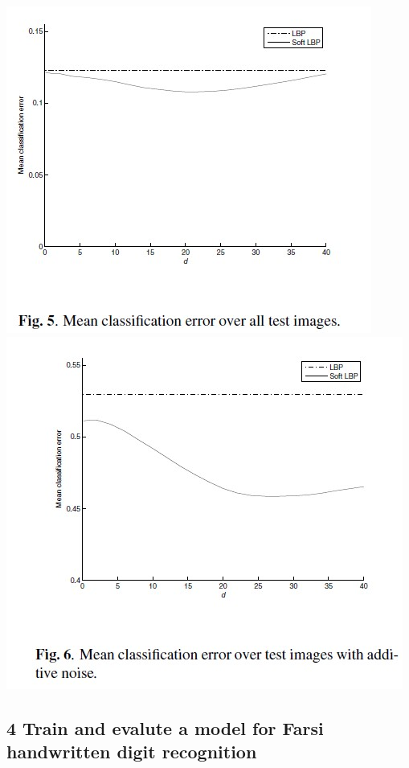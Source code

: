 \documentclass[11pt]{article}
\makeatletter
\def\maxwidth{\ifdim\Gin@nat@width>\linewidth\linewidth
    \else\Gin@nat@width\fi}
\let\Oldincludegraphics\includegraphics
\renewcommand{\includegraphics}[1]{\Oldincludegraphics[width=.8\maxwidth]{#1}}
\makeatother
\begin{document}
\includegraphics{wiki/3_2_7.jpg} \includegraphics{wiki/3_2_8.jpg}

    \hypertarget{train-and-evalute-a-model-for-farsi-handwritten-digit-recognition}{%
\subsection{4 Train and evalute a model for Farsi handwritten digit
recognition}\label{train-and-evalute-a-model-for-farsi-handwritten-digit-recognition}}
\end{document}
